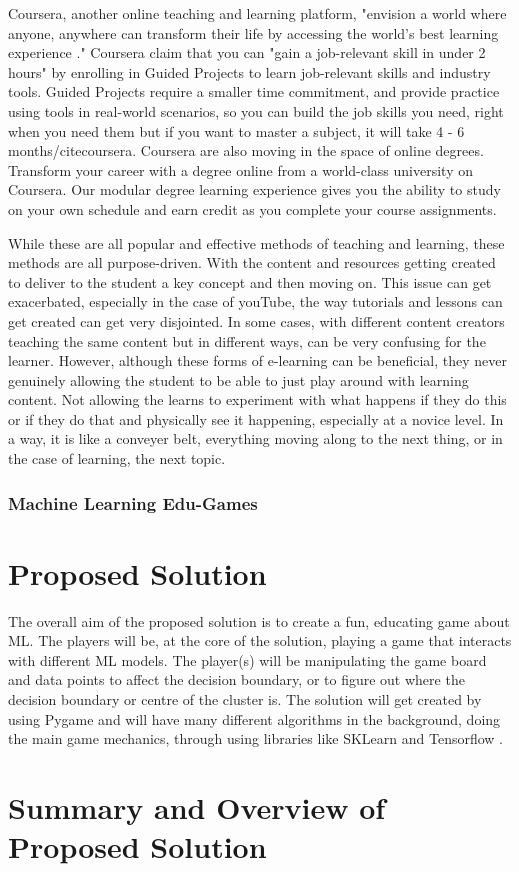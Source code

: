 		Coursera, another online teaching and learning platform, "envision a world where anyone, anywhere can transform their life by accessing the world's best learning experience \cite{coursera}." Coursera claim that you can "gain a job-relevant skill in under 2 hours" by enrolling in Guided Projects to learn job-relevant skills and industry tools. Guided Projects require a smaller time commitment, and provide practice using tools in real-world scenarios, so you can build the job skills you need, right when you need them but if you want to master a subject, it will take 4 - 6 months/cite{coursera}. Coursera are also moving in the space of online degrees. Transform your career with a degree online from a world-class university on Coursera. Our modular degree learning experience gives you the ability to study on your own schedule and earn credit as you complete your course assignments. 
		
		While these are all popular and effective methods of teaching and learning, these methods are all purpose-driven. With the content and resources getting created to deliver to the student a key concept and then moving on. This issue can get exacerbated, especially in the case of youTube, the way tutorials and lessons can get created can get very disjointed. In some cases, with different content creators teaching the same content but in different ways, can be very confusing for the learner. However, although these forms of e-learning can be beneficial, they never genuinely allowing the student to be able to just play around with learning content. Not allowing the learns to experiment with what happens if they do this or if they do that and physically see it happening, especially at a novice level. In a way, it is like a conveyer belt, everything moving along to the next thing, or in the case of learning, the next topic.
	
	
	\subsubsection{Machine Learning Edu-Games}
		\label{sub_sec:ml_edu_games}
	
	\section{Proposed Solution}
	The overall aim of the proposed solution is to create a fun, educating game about ML. The players will be, at the core of the solution, playing a game that interacts with different ML models. The player(s) will be manipulating the game board and data points to affect the decision boundary, or to figure out where the decision boundary or centre of the cluster is. The solution will get created by using  Pygame and will have many different algorithms in the background, doing the main game mechanics, through using libraries like SKLearn \cite{sklearn_api} and Tensorflow \cite{tensorflow2015-whitepaper}.
	
	\section{Summary and Overview of Proposed Solution}
	